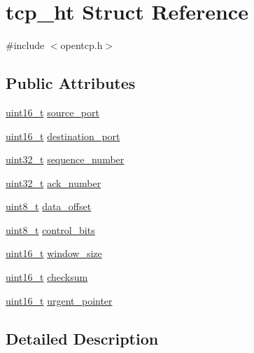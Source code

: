\hypertarget{structtcp__ht}{}\section{tcp\+\_\+ht Struct Reference}
\label{structtcp__ht}


{\ttfamily \#include $<$opentcp.\+h$>$}

\subsection*{Public Attributes}
\begin{DoxyCompactItemize}
\item 
\hyperlink{_p_e___types_8h_a1f1825b69244eb3ad2c7165ddc99c956}{uint16\+\_\+t} \hyperlink{structtcp__ht_aaebe6bc1332b37a8f1e089733aa93ce5}{source\+\_\+port}
\item 
\hyperlink{_p_e___types_8h_a1f1825b69244eb3ad2c7165ddc99c956}{uint16\+\_\+t} \hyperlink{structtcp__ht_a0123c2451b3c2772c76190acc965a871}{destination\+\_\+port}
\item 
\hyperlink{_p_e___types_8h_a33594304e786b158f3fb30289278f5af}{uint32\+\_\+t} \hyperlink{structtcp__ht_a8c760706181a33f5281741bd710aeedd}{sequence\+\_\+number}
\item 
\hyperlink{_p_e___types_8h_a33594304e786b158f3fb30289278f5af}{uint32\+\_\+t} \hyperlink{structtcp__ht_a350036cbf2c232d6cd2db1a431114f1d}{ack\+\_\+number}
\item 
\hyperlink{_p_e___types_8h_aba7bc1797add20fe3efdf37ced1182c5}{uint8\+\_\+t} \hyperlink{structtcp__ht_a6b4becfb36132b0cd9c30995c01673d3}{data\+\_\+offset}
\item 
\hyperlink{_p_e___types_8h_aba7bc1797add20fe3efdf37ced1182c5}{uint8\+\_\+t} \hyperlink{structtcp__ht_a1c873c72bb2ce13122fa91ded3f99f81}{control\+\_\+bits}
\item 
\hyperlink{_p_e___types_8h_a1f1825b69244eb3ad2c7165ddc99c956}{uint16\+\_\+t} \hyperlink{structtcp__ht_a857891d90f550100319b144d34f91752}{window\+\_\+size}
\item 
\hyperlink{_p_e___types_8h_a1f1825b69244eb3ad2c7165ddc99c956}{uint16\+\_\+t} \hyperlink{structtcp__ht_a0868d73b5b1fc0a093a6db49053f3765}{checksum}
\item 
\hyperlink{_p_e___types_8h_a1f1825b69244eb3ad2c7165ddc99c956}{uint16\+\_\+t} \hyperlink{structtcp__ht_a84d811343254ceb2c9a5a5104ca68993}{urgent\+\_\+pointer}
\end{DoxyCompactItemize}


\subsection{Detailed Description}


